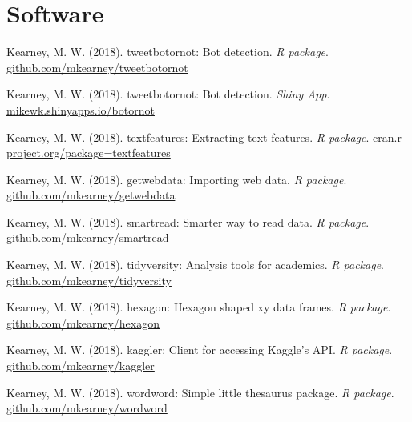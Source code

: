 \section{Software}

\begin{bibenum}

  \item Kearney, M. W. (2018).
    tweetbotornot: Bot detection.
    \textit{R package}.
    \href{https://github.com/mkearney/tweetbotornot}{github.com/mkearney/tweetbotornot}

  \item Kearney, M. W. (2018).
    tweetbotornot: Bot detection.
    \textit{Shiny App}.
    \href{https://mikewk.shinyapps.io/botornot/}{mikewk.shinyapps.io/botornot}

  \item Kearney, M. W. (2018).
    textfeatures: Extracting text features.
    \textit{R package}.
    \href{http://cran.r-project.org/package=textfeatures}{cran.r-project.org/package=textfeatures}

  \item Kearney, M. W. (2018).
    getwebdata: Importing web data.
    \textit{R package}.
    \href{https://github.com/mkearney/getwebdata}{github.com/mkearney/getwebdata}

  \item Kearney, M. W. (2018).
    smartread: Smarter way to read data.
    \textit{R package}.
    \href{https://github.com/mkearney/smartread}{github.com/mkearney/smartread}

  \item Kearney, M. W. (2018).
    tidyversity: Analysis tools for academics.
    \textit{R package}.
    \href{https://github.com/mkearney/tidyversity}{github.com/mkearney/tidyversity}

  \item Kearney, M. W. (2018).
    hexagon: Hexagon shaped xy data frames.
    \textit{R package}.
    \href{https://github.com/mkearney/hexagon}{github.com/mkearney/hexagon}

  \item Kearney, M. W. (2018).
    kaggler: Client for accessing Kaggle’s API.
    \textit{R package}.
    \href{https://github.com/mkearney/kaggler}{github.com/mkearney/kaggler}

  \item Kearney, M. W. (2018).
    wordword: Simple little thesaurus package.
    \textit{R package}.
    \href{https://github.com/mkearney/wordword}{github.com/mkearney/wordword}


\end{bibenum}
